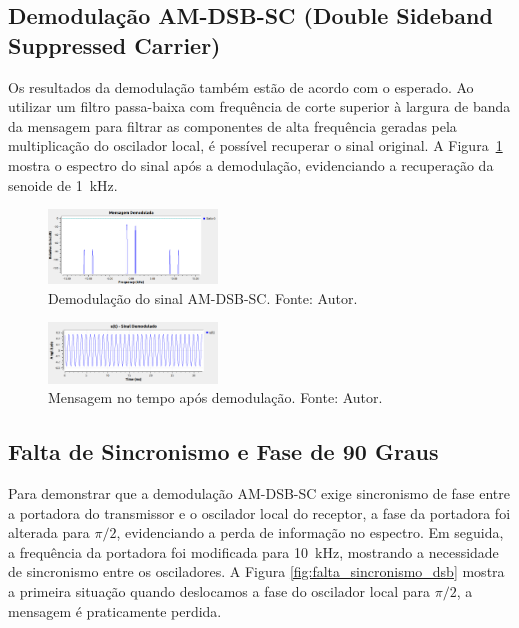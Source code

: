 \subsection{Demodulação AM-DSB-SC (Double Sideband Suppressed Carrier)}

Os resultados da demodulação também estão de acordo com o esperado. Ao utilizar um filtro passa-baixa com frequência de corte superior à largura de banda da mensagem para filtrar as componentes de alta frequência geradas pela multiplicação do oscilador local, é possível recuperar o sinal original. A Figura~\ref{fig:demodulacao_am_dsb} mostra o espectro do sinal após a demodulação, evidenciando a recuperação da senoide de 1~kHz.

\begin{figure}[!htpb]
    \centering
    \includegraphics[width=0.4\textwidth]{images/demodulacao_am_dsb_freq.png}
    \caption{Demodulação do sinal AM-DSB-SC. Fonte: Autor.}
    \label{fig:demodulacao_am_dsb}
\end{figure}

\begin{figure}[!htpb]
    \centering
    \includegraphics[width=0.4\textwidth]{images/mensagem_demodulada.png}
    \caption{Mensagem no tempo após demodulação. Fonte: Autor.}
    \label{fig:mensagem_demodulada_am_dsb}
\end{figure}

\subsection{Falta de Sincronismo e Fase de 90 Graus}
Para demonstrar que a demodulação AM-DSB-SC exige sincronismo de fase entre a portadora do transmissor e o oscilador local do receptor, a fase da portadora foi alterada para $\pi/2$, evidenciando a perda de informação no espectro. Em seguida, a frequência da portadora foi modificada para 10~kHz, mostrando a necessidade de sincronismo entre os osciladores. A Figura \ref{fig:falta_sincronismo_dsb} mostra a primeira situação quando deslocamos a fase do oscilador local para $\pi/2$, a mensagem é praticamente perdida.

